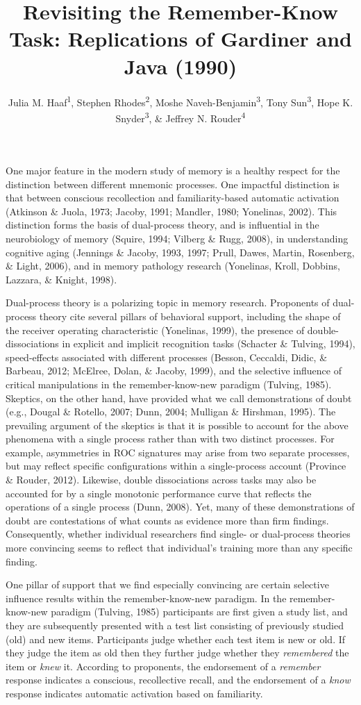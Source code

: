 \documentclass[english,,man,floatsintext]{apa6}
\title{Revisiting the Remember-Know Task: Replications of Gardiner and Java (1990)}
\author{Julia M. Haaf\textsuperscript{1}, Stephen Rhodes\textsuperscript{2}, Moshe Naveh-Benjamin\textsuperscript{3}, Tony Sun\textsuperscript{3}, Hope K. Snyder\textsuperscript{3}, \& Jeffrey N. Rouder\textsuperscript{4}}
\date{}
\affiliation{\vspace{0.5cm}\textsuperscript{1} University of Amsterdam\\\textsuperscript{2} Rotman Research Institute, Baycrest\\\textsuperscript{3} University of Missouri\\\textsuperscript{4} University of California, Irvine}
\begin{document}
\maketitle

One major feature in the modern study of memory is a healthy respect for the distinction between different mnemonic processes. One impactful distinction is that between conscious recollection and familiarity-based automatic activation (Atkinson \& Juola, 1973; Jacoby, 1991; Mandler, 1980; Yonelinas, 2002). This distinction forms the basis of dual-process theory, and is influential in the neurobiology of memory (Squire, 1994; Vilberg \& Rugg, 2008), in understanding cognitive aging (Jennings \& Jacoby, 1993, 1997; Prull, Dawes, Martin, Rosenberg, \& Light, 2006), and in memory pathology research (Yonelinas, Kroll, Dobbins, Lazzara, \& Knight, 1998).

Dual-process theory is a polarizing topic in memory research. Proponents of dual-process theory cite several pillars of behavioral support, including the shape of the receiver operating characteristic (Yonelinas, 1999), the presence of double-dissociations in explicit and implicit recognition tasks (Schacter \& Tulving, 1994), speed-effects associated with different processes (Besson, Ceccaldi, Didic, \& Barbeau, 2012; McElree, Dolan, \& Jacoby, 1999), and the selective influence of critical manipulations in the remember-know-new paradigm (Tulving, 1985). Skeptics, on the other hand, have provided what we call demonstrations of doubt (e.g., Dougal \& Rotello, 2007; Dunn, 2004; Mulligan \& Hirshman, 1995). The prevailing argument of the skeptics is that it is possible to account for the above phenomena with a single process rather than with two distinct processes. For example, asymmetries in ROC signatures may arise from two separate processes, but may reflect specific configurations within a single-process account (Province \& Rouder, 2012). Likewise, double dissociations across tasks may also be accounted for by a single monotonic performance curve that reflects the operations of a single process (Dunn, 2008). Yet, many of these demonstrations of doubt are contestations of what counts as evidence more than firm findings. Consequently, whether individual researchers find single- or dual-process theories more convincing seems to reflect that individual's training more than any specific finding.

One pillar of support that we find especially convincing are certain selective influence results within the remember-know-new paradigm. In the remember-know-new paradigm (Tulving, 1985) participants are first given a study list, and they are subsequently presented with a test list consisting of previously studied (old) and new items. Participants judge whether each test item is new or old. If they judge the item as old then they further judge whether they \emph{remembered} the item or \emph{knew} it. According to proponents, the endorsement of a \emph{remember} response indicates a conscious, recollective recall, and the endorsement of a \emph{know} response indicates automatic activation based on familiarity.
\end{document}
